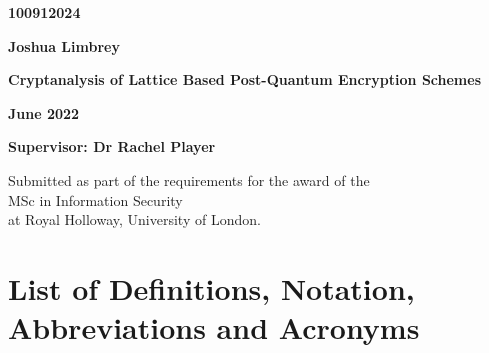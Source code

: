 \documentclass[a4paper, 10pt]{article}
\theoremstyle{definition}
\begin{document}
\begin{titlepage}
    \begin{center}
        \Large
        \textbf{100912024}

        \vspace{0.1cm}
        \textbf{Joshua Limbrey}

        \vspace{5cm}
        \LARGE
        \textbf{Cryptanalysis of Lattice Based Post-Quantum Encryption Schemes}

        \vspace{0.1cm}
        \textbf{June 2022}

        \vspace{1.5cm}
        \textbf{Supervisor: Dr Rachel Player}

        \vfill

        Submitted as part of the requirements for the award of the\\MSc in Information Security\\at Royal Holloway, University of London.


        \vspace{2.5cm}

    \end{center}
\end{titlepage}

\tableofcontents

\newpage

\section{List of Definitions, Notation, Abbreviations and Acronyms}
\begin{acronym}
\end{acronym}
\end{document}
